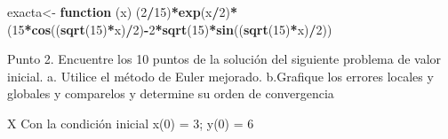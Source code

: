 \documentclass[]{article}
\newenvironment{Shaded}{\begin{snugshade}}{\end{snugshade}}
\newcommand{\KeywordTok}[1]{\textcolor[rgb]{0.13,0.29,0.53}{\textbf{#1}}}
\newcommand{\DecValTok}[1]{\textcolor[rgb]{0.00,0.00,0.81}{#1}}
\newcommand{\StringTok}[1]{\textcolor[rgb]{0.31,0.60,0.02}{#1}}
\newcommand{\ControlFlowTok}[1]{\textcolor[rgb]{0.13,0.29,0.53}{\textbf{#1}}}
\newcommand{\OperatorTok}[1]{\textcolor[rgb]{0.81,0.36,0.00}{\textbf{#1}}}
\newcommand{\NormalTok}[1]{#1}
\begin{document}
\begin{Shaded}
\begin{Highlighting}[]
\NormalTok{exacta<-}\StringTok{ }\ControlFlowTok{function}\NormalTok{ (x) (}\DecValTok{2}\OperatorTok{/}\DecValTok{15}\NormalTok{)}\OperatorTok{*}\KeywordTok{exp}\NormalTok{(x}\OperatorTok{/}\DecValTok{2}\NormalTok{)}\OperatorTok{*}\NormalTok{(}\DecValTok{15}\OperatorTok{*}\KeywordTok{cos}\NormalTok{((}\KeywordTok{sqrt}\NormalTok{(}\DecValTok{15}\NormalTok{)}\OperatorTok{*}\NormalTok{x)}\OperatorTok{/}\DecValTok{2}\NormalTok{)}\OperatorTok{-}\DecValTok{2}\OperatorTok{*}\KeywordTok{sqrt}\NormalTok{(}\DecValTok{15}\NormalTok{)}\OperatorTok{*}\KeywordTok{sin}\NormalTok{((}\KeywordTok{sqrt}\NormalTok{(}\DecValTok{15}\NormalTok{)}\OperatorTok{*}\NormalTok{x)}\OperatorTok{/}\DecValTok{2}\NormalTok{))}
\end{Highlighting}
\end{Shaded}

Punto 2. Encuentre los 10 puntos de la solución del siguiente problema
de valor inicial. a. Utilice el método de Euler mejorado. b.Grafique los
errores locales y globales y comparelos y determine su orden de
convergencia

X Con la condición inicial x(0) = 3; y(0) = 6
\end{document}
